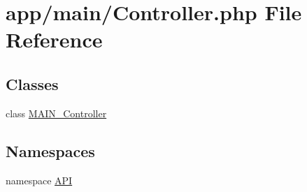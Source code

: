 \hypertarget{Controller_8php}{
\section{app/main/Controller.php File Reference}
\label{da/d82/Controller_8php}
}
\subsection*{Classes}
\begin{DoxyCompactItemize}
\item 
class \hyperlink{classMAIN__Controller}{MAIN\_\-Controller}
\end{DoxyCompactItemize}
\subsection*{Namespaces}
\begin{DoxyCompactItemize}
\item 
namespace \hyperlink{namespaceAPI}{API}
\end{DoxyCompactItemize}
